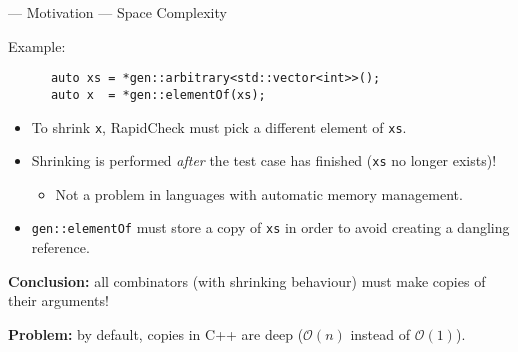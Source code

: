 \begin{frame}[fragile]{\halcheck{} --- Motivation --- Space Complexity}
  \begin{block}{Example:}
    \begin{verbatim}
      auto xs = *gen::arbitrary<std::vector<int>>();
      auto x  = *gen::elementOf(xs);
    \end{verbatim}
  \end{block}

  \pause{}

  \begin{itemize}
    \item To shrink \texttt{x}, RapidCheck must pick a different element of \texttt{xs}.
          \pause{}

    \item Shrinking is performed \emph{after} the test case has finished (\alert{\texttt{xs} no longer exists})!
          \begin{itemize}
            \item Not a problem in languages with automatic memory management.
          \end{itemize}
          \pause{}

    \item \texttt{gen::elementOf} must store a copy of \texttt{xs} in order to avoid creating a dangling reference.
          \pause{}
  \end{itemize}

  \textbf{Conclusion:} all combinators (with shrinking behaviour) must make copies of their arguments!

  \textbf{Problem:} by default, copies in C++ are deep ($\mathcal{O}(n)$ instead of $\mathcal{O}(1)$).
\end{frame}

